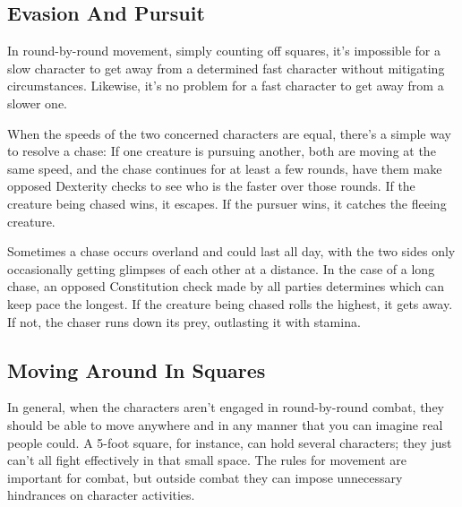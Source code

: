 \subsection{Evasion And Pursuit}
In round-by-round movement, simply counting off squares, it's impossible for a slow character to get away from a determined fast character without mitigating circumstances. Likewise, it's no problem for a fast character to get away from a slower one.

When the speeds of the two concerned characters are equal, there's a simple way to resolve a chase: If one creature is pursuing another, both are moving at the same speed, and the chase continues for at least a few rounds, have them make opposed Dexterity checks to see who is the faster over those rounds. If the creature being chased wins, it escapes. If the pursuer wins, it catches the fleeing creature.

Sometimes a chase occurs overland and could last all day, with the two sides only occasionally getting glimpses of each other at a distance. In the case of a long chase, an opposed Constitution check made by all parties determines which can keep pace the longest. If the creature being chased rolls the highest, it gets away. If not, the chaser runs down its prey, outlasting it with stamina.

\subsection{Moving Around In Squares}
In general, when the characters aren't engaged in round-by-round combat, they should be able to move anywhere and in any manner that you can imagine real people could. A 5-foot square, for instance, can hold several characters; they just can't all fight effectively in that small space. The rules for movement are important for combat, but outside combat they can impose unnecessary hindrances on character activities.




